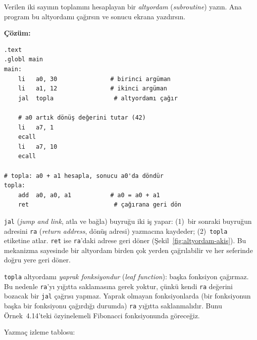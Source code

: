 \begin{ornek}[4.6]
\label{orn:altyordam-cagirma}
Verilen iki sayının toplamını hesaplayan bir \emph{altyordam} (\emph{subroutine}) yazın. Ana program bu altyordamı çağırsın ve sonucu ekrana yazdırsın.

\textbf{Çözüm:}

\begin{lstlisting}[style=riscv]
.text
.globl main
main:
    li   a0, 30               # birinci argüman
    li   a1, 12               # ikinci argüman
    jal  topla                 # altyordamı çağır

    # a0 artık dönüş değerini tutar (42)
    li   a7, 1
    ecall
    li   a7, 10
    ecall

# topla: a0 + a1 hesapla, sonucu a0'da döndür
topla:
    add  a0, a0, a1           # a0 = a0 + a1
    ret                        # çağırana geri dön
\end{lstlisting}

\texttt{jal} (\emph{jump and link}, atla ve bağla) buyruğu iki iş yapar: (1)~bir sonraki buyruğun adresini \texttt{ra} (\emph{return address}, dönüş adresi) yazmacına kaydeder; (2)~\texttt{topla} etiketine atlar. \texttt{ret} ise \texttt{ra}'daki adrese geri döner (Şekil~\ref{fig:altyordam-akis}). Bu mekanizma sayesinde bir altyordam birden çok yerden çağrılabilir ve her seferinde doğru yere geri döner.

\texttt{topla} altyordamı \emph{yaprak fonksiyondur} (\emph{leaf function}): başka fonksiyon çağırmaz. Bu nedenle \texttt{ra}'yı yığıtta saklamasına gerek yoktur, çünkü kendi \texttt{ra} değerini bozacak bir \texttt{jal} çağrısı yapmaz. Yaprak olmayan fonksiyonlarda (bir fonksiyonun başka bir fonksiyonu çağırdığı durumda) \texttt{ra} yığıtta saklanmalıdır. Bunu Örnek~4.14'teki özyinelemeli Fibonacci fonksiyonunda göreceğiz.

Yazmaç izleme tablosu:


\end{ornek}
